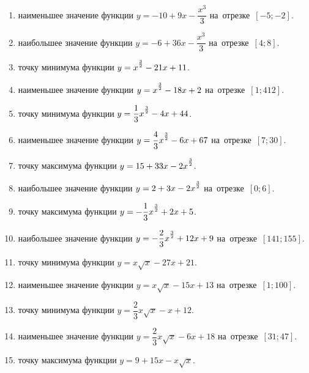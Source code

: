 \documentclass[a4paper,10pt]{article}
\begin{document}
\begin{enumerate}
\item {} наименьшее значение функции $y=-10 +9x-\dfrac{x^3}{3}$ на~отрезке~$\left[-5;-2\right]$.

\item {} наибольшее значение функции $y=-6 +36x-\dfrac{x^3}{3}$ на~отрезке~$\left[4;8\right]$.

\item {} точку минимума функции $y=x\strut^{\frac{3}{2}} -21x+11$.

\item {} наименьшее значение функции $y=x\strut^{\frac{3}{2}} -18x+2$ на~отрезке~$\left[1;412\right]$.

\item {} точку минимума функции $y=\dfrac{1}{3}x\strut^{\frac{3}{2}} -4x+44$.

\item {} наименьшее значение функции $y=\dfrac{4}{3}x\strut^{\frac{3}{2}} -6x+67$ на~отрезке~$\left[7;30\right]$.

\item {} точку максимума функции $y=15+33x-2x\strut^{\frac{3}{2}}$.

\item {} наибольшее значение функции $y=2+3x-2x\strut^{\frac{3}{2}}$ на~отрезке~$\left[0;6\right]$.

\item {} точку максимума функции $y=-\dfrac{1}{3}x\strut^{\frac{3}{2}} +2x+5$.

\item {} наибольшее значение функции $y=-\dfrac{2}{3}x\strut^{\frac{3}{2}} +12x+9$ на~отрезке~$\left[141;155\right]$.

\item {} точку минимума функции $y=x\sqrt{x} -27x+21$.

\item {} наименьшее значение функции $y=x\sqrt{x} -15x+13$ на~отрезке~$\left[1;100\right]$.

\item {} точку минимума функции $y=\dfrac{2}{3}x\sqrt{x} -x+12$.

\item {} наименьшее значение функции $y=\dfrac{2}{3}x\sqrt{x} -6x+18$ на~отрезке~$\left[31;47\right]$.

\item {} точку максимума функции $y=9+15x -x\sqrt{x}$.


\end{enumerate}
\end{document}
